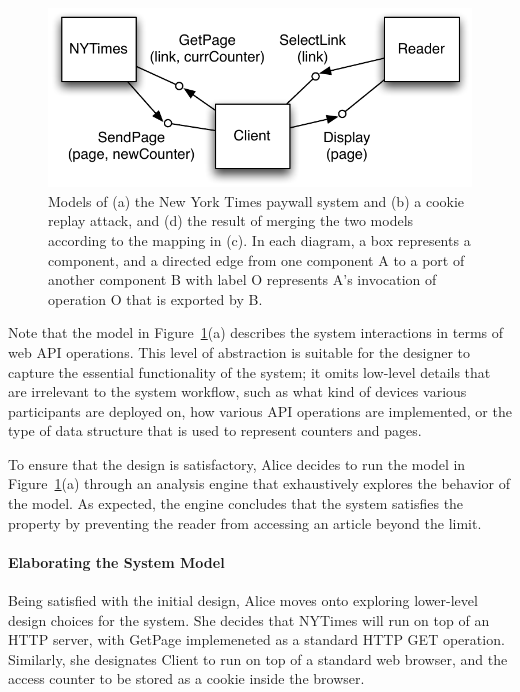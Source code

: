 \begin{figure}[!t]
\centering
\includegraphics[width=1.0\textwidth]{diagrams/nytimes}
\caption{Models of (a) the New York Times paywall system and (b) a
  cookie replay attack, and (d) the result of merging the two models
  according to the mapping in (c). In each diagram, a box represents a
  component, and a directed edge from one component \textsf{A} to a
  port of another component \textsf{B} with label \textsf{O}
  represents \textsf{A}'s invocation of operation \textsf{O} that is
  exported by \textsf{B}.}
\label{fig-nytimes}
\end{figure}

Note that the model in Figure~\ref{fig-nytimes}(a) describes the system
interactions in terms of web API operations. This level of abstraction
is suitable for the designer to capture the essential functionality of
the system; it omits low-level details that are irrelevant to the
system workflow, such as what kind of devices various participants
are deployed on, how various API operations are implemented, or the
type of data structure that is used to represent counters and pages.

To ensure that the design is satisfactory, Alice decides to run the
model in Figure~\ref{fig-nytimes}(a) through an analysis engine that
exhaustively explores the behavior of the model. As expected, the
engine concludes that the system satisfies the property by preventing
the reader from accessing an article beyond the limit.

\paragraph{\textbf{Elaborating the System Model}} Being satisfied with the
initial design, Alice moves onto exploring lower-level design
choices for the system. She decides that \textsf{NYTimes} will run on
top of an HTTP server, with \textsf{GetPage} implemeneted as a
standard HTTP GET operation. Similarly, she
designates \textsf{Client} to run on top of a standard web browser,
and the access counter to be stored as a cookie inside the browser.

